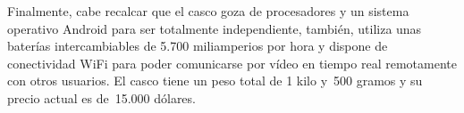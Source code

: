 Finalmente, cabe recalcar que el casco goza de procesadores y un sistema operativo Android para ser totalmente independiente, también, utiliza unas baterías intercambiables de 5.700 miliamperios por hora y dispone de conectividad WiFi para poder comunicarse por vídeo en tiempo real remotamente con otros usuarios. El casco tiene un peso total de 1 kilo y~500 gramos y su precio actual es de~15.000 dólares.



